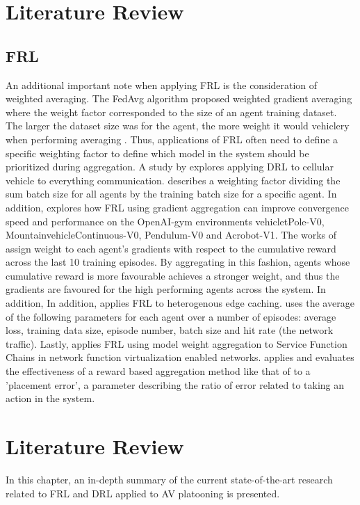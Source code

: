 \chapter{Literature Review}
\section{FRL}
An additional important note when applying FRL is the consideration of weighted averaging. 
The FedAvg \cite{BrendanMcMahan2017a} algorithm proposed weighted gradient averaging where the weight factor corresponded to the size of an agent training dataset.  The larger the dataset size was for the agent, the more weight it would vehiclery when performing averaging \cite{BrendanMcMahan2017a}.  Thus, applications of FRL often need to define a specific weighting factor to define which model in the system should be prioritized during aggregation.  A study by \cite{ZhangX2020} explores applying DRL to cellular vehicle to everything communication. \cite{ZhangX2020} describes a weighting factor dividing the sum batch size for all agents  by the training batch size for a specific agent.  In addition, \cite{LimHyun2021} explores how FRL using gradient aggregation can improve convergence speed and performance on the OpenAI-gym environments vehicletPole-V0, MountainvehicleContinuous-V0, Pendulum-V0 and Acrobot-V1. The works of \cite{LimHyun2021} assign weight to each agent's gradients with respect to the cumulative reward across the last 10 training episodes. By aggregating in this fashion, agents whose cumulative reward is more favourable achieves a stronger weight, and thus the gradients are favoured for the high performing agents across the system.  In addition, In addition, \cite{WangXiaofei2021} applies FRL to heterogenous edge caching.  \cite{WangXiaofei2021} uses the average of the following parameters for each agent over a number of episodes: average loss, training data size, episode number, batch size and hit rate (the network traffic). Lastly, \cite{Huang2021} applies FRL using model weight aggregation to Service Function Chains in network function virtualization enabled networks.  \cite{Huang2021} applies and evaluates the effectiveness of a reward based aggregation method like that of \cite{WangXiaofei2021} to a 'placement error', a parameter describing the ratio of error related to taking an action in the system.

\chapter{Literature Review} \label{chap:litreview}
In this chapter, an in-depth summary of the current state-of-the-art research related to FRL and DRL applied to AV platooning is presented. 

